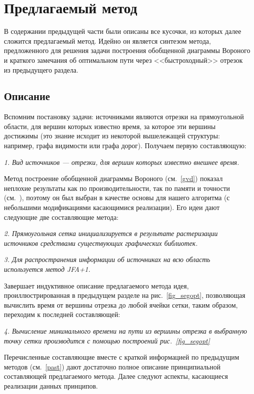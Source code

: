 \documentclass[12pt]{article}
\begin{document}
\section{Предлагаемый метод}
В содержании предыдущей части были описаны все кусочки, из которых 
далее сложится предлагаемый метод. Идейно он является синтезом метода, 
предложенного для решения задачи построения обобщенной диаграммы Вороного 
и краткого замечания об оптимальном пути через <<быстроходный>>
отрезок из предыдущего раздела.

\subsection{Описание}
Вспомним постановку задачи: источниками являются отрезки на 
прямоугольной области, для вершин которых известно время, за которое эти вершины
достижимы (это знание исходит из некоторой вышележащей структуры: например, 
графа видимости или графа дорог). Получаем первую составляющую:

\emph{1. Вид источников --- отрезки, для вершин которых известно внешнее время.}

Метод построение обобщенной диаграммы Вороного (см.~\ref{gvd}) показал неплохие
результаты как по производительности, так по памяти и точности (см.~\cite{gvd}), 
поэтому он был выбран в качестве основы для нашего алгоритма 
(с небольшими модификациями касающимися реализации). Его идеи дают
следующие две составляющие метода:

\emph{2. Прямоугольная сетка инициализируется в результате растеризации
источников средствами существующих графических библиотек.}

\emph{3. Для распространения информации об источниках на всю
область используется метод \emph{JFA+1}.}

Завершает индуктивное описание предлагаемого метода
идея, проиллюстрированная в предыдущем разделе на рис.~\ref{fig_segopt}, позволяющая
вычислить время от вершины отрезка до любой ячейки сетки, таким образом, переходим к
последней составляющей:

\emph{4. Вычисление минимального времени на пути из вершины отрезка
в выбранную точку сетки производится с помощью построений рис.~\ref{fig_segopt}}

Перечисленные составляющие вместе с краткой информацией по предыдущим
методов (см.~\ref{past}) дают достаточно полное описание принципиальной
составляющей предлагаемого метода. Далее следуют аспекты, касающиеся
реализации данных принципов.
\end{document}
